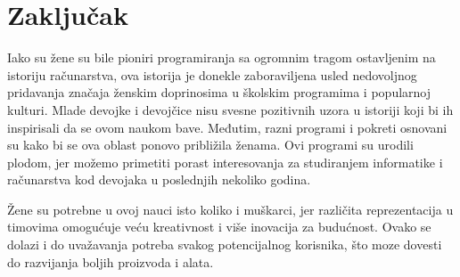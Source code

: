 \documentclass[12pt]{article}
\begin{document}
\newpage

\section{Zaključak}

Iako su žene su bile pioniri programiranja sa ogromnim tragom ostavljenim na istoriju računarstva, ova istorija je donekle zaboraviljena usled nedovoljnog pridavanja značaja ženskim doprinosima u školskim programima i popularnoj kulturi. Mlade devojke i devojčice nisu svesne pozitivnih uzora u istoriji koji bi ih inspirisali da se ovom naukom bave. Međutim, razni programi i pokreti osnovani su kako bi se ova oblast ponovo približila ženama. Ovi programi su urodili plodom, jer možemo primetiti porast interesovanja za studiranjem informatike i računarstva kod devojaka u poslednjih nekoliko godina.

Žene su potrebne u ovoj nauci isto koliko i muškarci, jer različita reprezentacija u timovima omogućuje veću kreativnost i više inovacija za budućnost. Ovako se dolazi i do uvažavanja potreba svakog potencijalnog korisnika, što moze dovesti do razvijanja boljih proizvoda i alata.

\newpage
\end{document}

